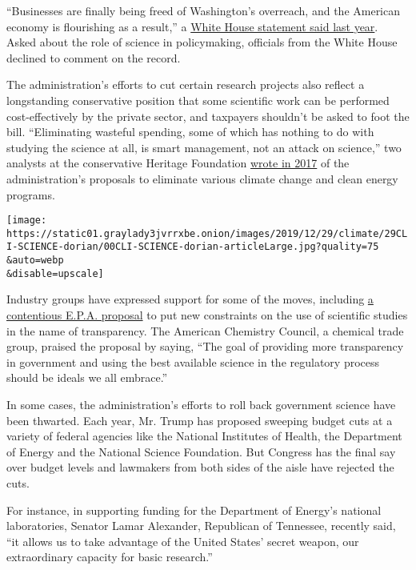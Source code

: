 ``Businesses are finally being freed of Washington's overreach, and the
American economy is flourishing as a result,'' a
\href{https://www.whitehouse.gov/briefings-statements/president-donald-j-trump-following-promise-cut-burdensome-red-tape-unleash-american-economy/}{White
House statement said last year}. Asked about the role of science in
policymaking, officials from the White House declined to comment on the
record.

The administration's efforts to cut certain research projects also
reflect a longstanding conservative position that some scientific work
can be performed cost-effectively by the private sector, and taxpayers
shouldn't be asked to foot the bill. ``Eliminating wasteful spending,
some of which has nothing to do with studying the science at all, is
smart management, not an attack on science,'' two analysts at the
conservative Heritage Foundation
\href{https://www.heritage.org/energy-economics/commentary/climate-budget-cuts-are-smart-management-not-attack-science-0}{wrote
in 2017} of the administration's proposals to eliminate various climate
change and clean energy programs.

\texttt{[image: https://static01.graylady3jvrrxbe.onion/images/2019/12/29/climate/29CLI-SCIENCE-dorian/00CLI-SCIENCE-dorian-articleLarge.jpg?quality=75\\\&auto=webp\\\&disable=upscale]}

Industry groups have expressed support for some of the moves, including
\href{https://www.nytimes3xbfgragh.onion/2018/03/26/climate/epa-scientific-transparency-honest-act.html}{a
contentious E.P.A. proposal} to put new constraints on the use of
scientific studies in the name of transparency. The American Chemistry
Council, a chemical trade group, praised the proposal by saying, ``The
goal of providing more transparency in government and using the best
available science in the regulatory process should be ideals we all
embrace.''

In some cases, the administration's efforts to roll back government
science have been thwarted. Each year, Mr. Trump has proposed sweeping
budget cuts at a variety of federal agencies like the National
Institutes of Health, the Department of Energy and the National Science
Foundation. But Congress has the final say over budget levels and
lawmakers from both sides of the aisle have rejected the cuts.

For instance, in supporting funding for the Department of Energy's
national laboratories, Senator Lamar Alexander, Republican of Tennessee,
recently said, ``it allows us to take advantage of the United States'
secret weapon, our extraordinary capacity for basic research.''

